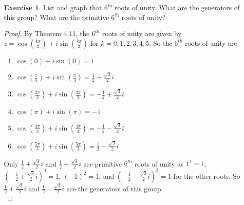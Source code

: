 \documentclass{article}
\theoremstyle{definition}
\newtheorem{theorem}{Exercise}[section]
\theoremstyle{remark}
\begin{document}
	\setcounter{theorem}{19}
	\begin{theorem}
		List and graph that $6^{\textit{th}}$ roots of unity. What are the generators of this group? What are the primitive $6^{\textit{th}}$ roots of unity? 
	\end{theorem}
	\begin{proof} By Theorem 4.11, the $6^{\textit{th}}$ roots of unity are given by $z=\cos\left(\frac{k\pi}{3}\right)+i\sin
		\left(\frac{k\pi}{3}\right)$ for $k=0,1,2,3,4,5$. So the $6^{\textit{th}}$ roots of unity are 
		\begin{multicols}{3}
			\begin{enumerate}
				\item $\cos\left(0\right)+i\sin\left(0\right)=1$
				\item $\cos\left(\frac{\pi}{3}\right)+i\sin\left(\frac{\pi}{3}\right)=\frac{1}{2}+\frac{\sqrt{3}}{2}i$
				\item $\cos\left(\frac{2\pi}{3}\right)+i\sin\left(\frac{2\pi}{3}\right)=-\frac{1}{2}+\frac{\sqrt{3}}{2}i$
				\item $\cos\left(\pi\right)+i\sin\left(\pi\right)=-1$
				\item $\cos\left(\frac{4\pi}{3}\right)+i\sin\left(\frac{4\pi}{3}\right)=-\frac{1}{2}-\frac{\sqrt{3}}{2}i$
				\item $\cos\left(\frac{5\pi}{3}\right)+i\sin\left(\frac{5\pi}{3}\right)=\frac{1}{2}-\frac{\sqrt{3}}{2}i$
			\end{enumerate}
		\end{multicols}
		Only $\frac{1}{2}+\frac{\sqrt{3}}{2}i$ and $\frac{1}{2}-\frac{\sqrt{3}}{2}i$ are primitive $6^{\textit{th}}$ roots of unity as $1^1=1$, $\left(-\frac{1}{2}+\frac{\sqrt{3}}{2}i\right)^3=1$, $\left(-1\right)^2=1$, and $\left(-\frac{1}{2}-\frac{\sqrt{3}}{2}i\right)^3=1$ for the other roots. So $\frac{1}{2}+\frac{\sqrt{3}}{2}i$ and $\frac{1}{2}-\frac{\sqrt{3}}{2}i$ are the generators of this group.\qedhere\\
		
\end{proof}
\end{document}
